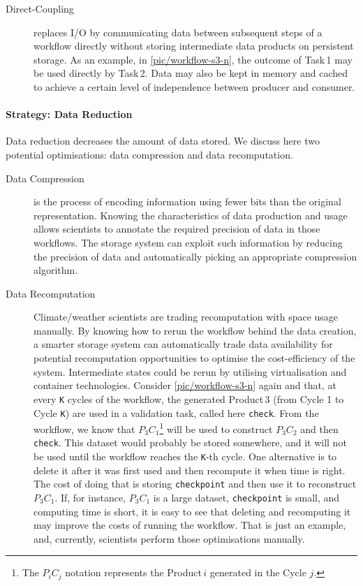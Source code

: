 \documentclass{superfri}
\begin{document}
\begin{description}
\item[Direct-Coupling] replaces I/O by communicating data between subsequent steps of a workflow directly without storing intermediate data products on persistent storage.
As an example, in \cref{pic/workflow-s3-n}, the outcome of Task\,1 may be used directly by Task\,2.
Data may also be kept in memory and cached to achieve a certain level of independence between producer and consumer.

\end{description}

\paragraph{Strategy: Data Reduction}

Data reduction decreases the amount of data stored.
We discuss here two potential optimisations: data compression and data recomputation.

\begin{description}

\item[Data Compression] is the process of encoding information using fewer bits than the original representation.
Knowing the characteristics of data production and usage allows scientists to annotate the required precision of data in those workflows.
The storage system can exploit such information by reducing the precision of data and automatically picking an appropriate compression algorithm.

\item[Data Recomputation] Climate/weather scientists are trading recomputation with space usage manually.
By knowing how to rerun the workflow behind the data creation, a smarter storage system can automatically trade data availability for potential recomputation opportunities to optimise the cost-efficiency of the system.
Intermediate states could be rerun by utilising virtualisation and container technologies.
Consider \cref{pic/workflow-s3-n} again and that, at every \texttt{K} cycles of the workflow, the generated Product\,3 (from Cycle 1 to Cycle \texttt{K}) are used in a validation task, called here \texttt{check}.
From the workflow, we know that $P_3 C_1$\footnote{The $P_i C_j$ notation represents the Product\,$i$ generated in the Cycle $j$.} will be used to construct $P_3 C_2$ and then \texttt{check}.
This dataset would probably be stored somewhere, and it will not be used until the workflow reaches the \texttt{K}-th cycle.
One alternative is to delete it after it was first used and then recompute it when time is right.
The cost of doing that is storing \texttt{checkpoint} and then use it to reconstruct $P_3 C_1$.
If, for instance, $P_3 C_1$ is a large dataset, \texttt{checkpoint} is small, and computing time is short, it is easy to see that deleting and recomputing it may improve the costs of running the workflow.
That is just an example, and, currently, scientists perform those optimisations manually.
\end{description}
\end{document}
